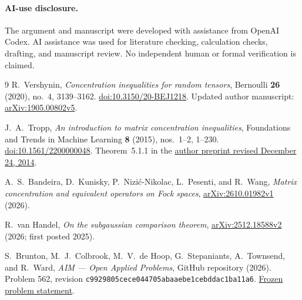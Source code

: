 \documentclass[11pt]{article}
\begin{document}
\paragraph{AI-use disclosure.}
The argument and manuscript were developed with assistance from
OpenAI Codex. AI assistance was used for literature checking,
calculation checks, drafting, and manuscript review.
No independent human or formal verification is claimed.

\begin{thebibliography}{9}
R.~Vershynin,
\emph{Concentration inequalities for random tensors},
Bernoulli \textbf{26} (2020), no.~4, 3139--3162.
\href{https://doi.org/10.3150/20-BEJ1218}{doi:10.3150/20-BEJ1218}.
Updated author manuscript:
\href{https://arxiv.org/abs/1905.00802v5}{arXiv:1905.00802v5}.

J.~A.~Tropp,
\emph{An introduction to matrix concentration inequalities},
Foundations and Trends in Machine Learning \textbf{8} (2015),
nos.~1--2, 1--230.
\href{https://doi.org/10.1561/2200000048}{doi:10.1561/2200000048}.
Theorem~5.1.1 in the
\href{https://tropp.caltech.edu/books/Tro14-Introduction-Matrix-preprint.pdf}
{author preprint revised December 24, 2014}.

A.~S.~Bandeira, D.~Kunisky, P.~Nizi\'c-Nikolac, L.~Pesenti, and R.~Wang,
\emph{Matrix concentration and equivalent operators on Fock spaces},
\href{https://arxiv.org/abs/2610.01982v1}{arXiv:2610.01982v1} (2026).

R.~van Handel,
\emph{On the subgaussian comparison theorem},
\href{https://arxiv.org/abs/2512.18588v2}{arXiv:2512.18588v2} (2026;
first posted 2025).

S.~Brunton, M.~J.~Colbrook, M.~V.~de Hoop, G.~Stepaniants,
A.~Townsend, and R.~Ward,
\emph{AIM --- Open Applied Problems}, GitHub repository (2026).
Problem 562, revision
\nolinkurl{c9929805cece044705abaaebe1cebddac1ba11a6}.
\href{https://github.com/MColbrook/AIM/blob/c9929805cece044705abaaebe1cebddac1ba11a6/problems/562-tensor-singular-value.md}
{Frozen problem statement}.
\end{thebibliography}
\end{document}
